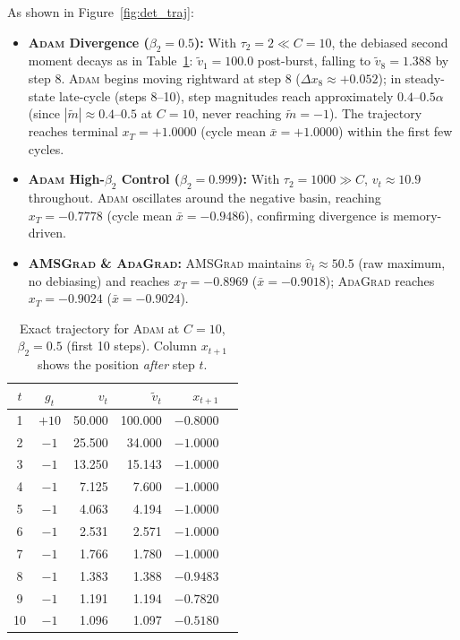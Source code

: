 As shown in Figure~\ref{fig:det_traj}:
\begin{itemize}
    \item \textbf{\textsc{Adam} Divergence ($\beta_2 = 0.5$):} With $\tau_2 = 2 \ll C=10$, the debiased second moment decays as in Table~\ref{tab:vt_trajectory}: $\tilde{v}_1 = 100.0$ post-burst, falling to $\tilde{v}_8 = 1.388$ by step 8. \textsc{Adam} begins moving rightward at step 8 ($\Delta x_8 \approx +0.052$); in steady-state late-cycle (steps 8--10), step magnitudes reach approximately $0.4$--$0.5\alpha$ (since $|\tilde{m}| \approx 0.4$--$0.5$ at $C=10$, never reaching $\tilde{m}=-1$). The trajectory reaches terminal $x_T = +1.0000$ (cycle mean $\bar{x} = +1.0000$) within the first few cycles.
    \item \textbf{\textsc{Adam} High-$\beta_2$ Control ($\beta_2 = 0.999$):} With $\tau_2 = 1000 \gg C$, $v_t \approx 10.9$ throughout. \textsc{Adam} oscillates around the negative basin, reaching $x_T = -0.7778$ (cycle mean $\bar{x} = -0.9486$), confirming divergence is memory-driven.
    \item \textbf{\textsc{AMSGrad} \& \textsc{AdaGrad}:} \textsc{AMSGrad} maintains $\hat{v}_t \approx 50.5$ (raw maximum, no debiasing) and reaches $x_T = -0.8969$ ($\bar{x} = -0.9018$); \textsc{AdaGrad} reaches $x_T = -0.9024$ ($\bar{x} = -0.9024$).
\end{itemize}

\begin{table}[h]
\centering
\scriptsize
\caption{Exact trajectory for \textsc{Adam} at $C=10$, $\beta_2=0.5$ (first 10 steps). Column $x_{t+1}$ shows the position \emph{after} step $t$.}
\label{tab:vt_trajectory}
\begin{tabular}{ccrrrr}
\toprule
$t$ & $g_t$ & $v_t$ & $\tilde{v}_t$ & $x_{t+1}$ \\
\midrule
1  & $+10$ & 50.000 & 100.000 & $-0.8000$ \\
2  & $-1$  & 25.500 &  34.000 & $-1.0000$ \\
3  & $-1$  & 13.250 &  15.143 & $-1.0000$ \\
4  & $-1$  &  7.125 &   7.600 & $-1.0000$ \\
5  & $-1$  &  4.063 &   4.194 & $-1.0000$ \\
6  & $-1$  &  2.531 &   2.571 & $-1.0000$ \\
7  & $-1$  &  1.766 &   1.780 & $-1.0000$ \\
8  & $-1$  &  1.383 &   1.388 & $-0.9483$ \\
9  & $-1$  &  1.191 &   1.194 & $-0.7820$ \\
10 & $-1$  &  1.096 &   1.097 & $-0.5180$ \\
\bottomrule
\end{tabular}
\end{table}

